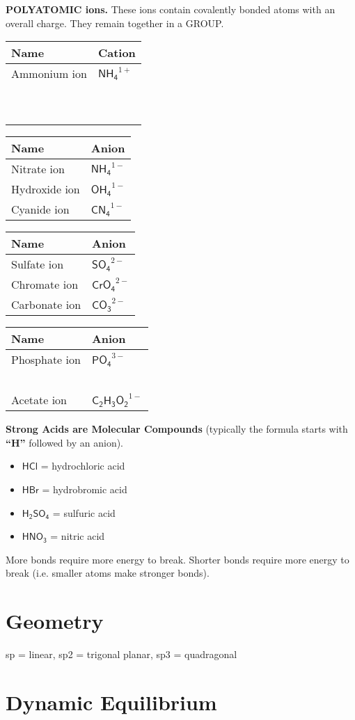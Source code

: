 \documentclass{article}
\theoremstyle{mytheoremstyle}
\theoremstyle{mytheoremstyle}
\theoremstyle{myproblemstyle}
\begin{document}
\textbf{POLYATOMIC ions.} These ions contain covalently bonded atoms with an overall charge. They remain together in a GROUP.

\begin{tabular}{ll}
    \textbf{Name} & \textbf{Cation} \\
    \hline
    Ammonium ion & \(\mathsf {NH_4}^{1+}\) \\
    ~            &                   \\
    ~            &                   \\
\end{tabular}
\begin{tabular}{ll}
    \textbf{Name} & \textbf{Anion} \\
    \hline
    Nitrate ion   & \(\mathsf {NH_4}^{1-}\) \\
    Hydroxide ion & \(\mathsf {OH_4}^{1-}\) \\
    Cyanide ion   & \(\mathsf {CN_4}^{1-}\) \\
\end{tabular}

\begin{tabular}{ll}
    \textbf{Name} & \textbf{Anion} \\
    \hline
    Sulfate ion   & \(\mathsf {SO_4}^{2-}\)  \\
    Chromate ion  & \(\mathsf {CrO_4}^{2-}\) \\
    Carbonate ion & \(\mathsf {CO_3}^{2-}\)  \\
\end{tabular}
\begin{tabular}{ll}
    \textbf{Name} & \textbf{Anion} \\
    \hline
    Phosphate ion & \(\mathsf {PO_4}^{3-}\)      \\
    ~             &                        \\
    Acetate ion   & \(\mathsf {C_2H_3O_2}^{1-}\) \\
\end{tabular}

\textbf{Strong Acids are Molecular Compounds} (typically the formula starts with \textbf{``H''} followed by an anion).

\begin{itemize}
    \item \(\mathsf{HCl}\) = hydrochloric acid
    \item \(\mathsf{HBr}\) = hydrobromic acid
    \item \(\mathsf{H_2SO_4}\) = sulfuric acid
    \item \(\mathsf{HNO_3}\) = nitric acid
\end{itemize}

More bonds require more energy to break. Shorter bonds require more energy to break (i.e. smaller atoms make stronger bonds).

\section{Geometry}

sp = linear, sp2 = trigonal planar, sp3 = quadragonal

\section{Dynamic Equilibrium}
\end{document}
